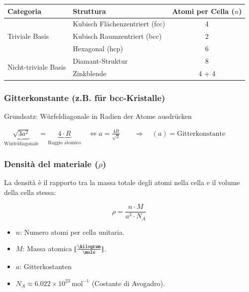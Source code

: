\begin{tabular}{|l|l|c|}
\hline
\textbf{Categoria} & \textbf{Struttura} & \textbf{Atomi per Cella ($n$)} \\ \hline
\multirow{3}{*}{Triviale Basis} & Kubisch Flächenzentriert (fcc) & 4 \\ \cline{2-3} 
 & Kubisch Raumzentriert (bcc) & 2 \\ \cline{2-3} 
 & Hexagonal (hcp) & 6 \\ \hline
\multirow{2}{*}{Nicht-triviale Basis} & Diamant-Struktur & 8 \\ \cline{2-3} 
 & Zinkblende & 4 + 4 \\ \hline
\end{tabular}

\subsubsection{Gitterkonstante (z.B. für bcc-Kristalle)}
Grundsatz: Würfeldiagonale in Radien der Atome ausdrücken

$ \underbrace{\sqrt{3a^2}}_{\text{Würfeldiagonale}} = \underbrace{4 \cdot R}_{\text{Raggio atomico}} 
\quad \Leftrightarrow a = \frac{4R}{\sqrt{3}} \qquad \Rightarrow 
\quad (a) = \text{Gitterkonstante} $


\subsubsection{Densità del materiale ($\rho$)}

La densità è il rapporto tra la massa totale degli atomi nella cella e il volume della cella stessa:

\begin{minipage}{0.4\columnwidth}
	$$\rho = \frac{n \cdot M}{a^3 \cdot N_A}$$
\end{minipage}
\begin{minipage}{0.6\columnwidth}
	\begin{itemize}
		\item $n$: Numero atomi per cella unitaria.
		\item $M$: Massa atomica $[\frac{\kilogram}{\mole}]$.
		\item $a$: Gitterkostanten
		\item $N_A \approx 6.022 \times 10^{23} \, \text{mol}^{-1}$ (Costante di Avogadro).
	\end{itemize}
\end{minipage}

